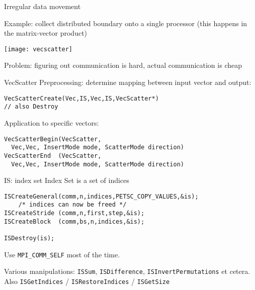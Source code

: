 

\begin{numberedframe}{Irregular data movement}

  Example: collect distributed boundary onto a single processor
  (this happens in the matrix-vector product)

  \texttt{[image: vecscatter]}

  Problem: figuring out communication is hard, actual communication is
  cheap
\end{numberedframe}

\begin{numberedframe}{VecScatter}
Preprocessing: determine mapping between input vector and output:
\begin{verbatim}
VecScatterCreate(Vec,IS,Vec,IS,VecScatter*) 
// also Destroy
\end{verbatim}
Application to specific vectors:
\begin{verbatim}
VecScatterBegin(VecScatter,
  Vec,Vec, InsertMode mode, ScatterMode direction)
VecScatterEnd  (VecScatter,
  Vec,Vec, InsertMode mode, ScatterMode direction)
\end{verbatim}
\end{numberedframe}

\begin{numberedframe}{IS: index set}
Index Set is a set of indices
\begin{verbatim}
ISCreateGeneral(comm,n,indices,PETSC_COPY_VALUES,&is);
    /* indices can now be freed */
ISCreateStride (comm,n,first,step,&is);
ISCreateBlock  (comm,bs,n,indices,&is);

ISDestroy(is);
\end{verbatim}
Use \lstinline{MPI_COMM_SELF} most of the time.

Various manipulations: \lstinline{ISSum}, \lstinline{ISDifference}, \lstinline{ISInvertPermutations}
et cetera.\\
Also \lstinline{ISGetIndices} / \lstinline{ISRestoreIndices} / \lstinline{ISGetSize}
\end{numberedframe}

